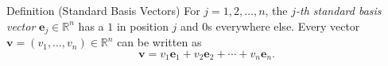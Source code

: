 \begin{propositionbox}{Definition (Standard Basis Vectors)}
For $j = 1, 2, \ldots, n$, the \emph{$j$-th standard basis vector} $\mathbf{e}_j \in \mathbb{R}^n$
has a $1$ in position $j$ and $0$s everywhere else.
Every vector $\mathbf{v} = (v_1, \ldots, v_n) \in \mathbb{R}^n$ can be written as
\[
  \mathbf{v} = v_1 \mathbf{e}_1 + v_2 \mathbf{e}_2 + \cdots + v_n \mathbf{e}_n.
\]
\end{propositionbox}
